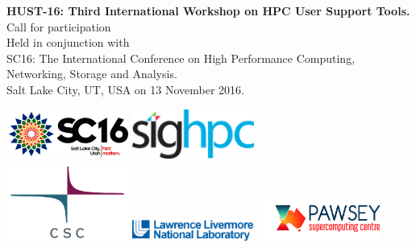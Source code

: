 \documentclass[11pt,a4paper]{article}
\begin{document}
\begin{titlepage}
\begin{center}
\vspace{35mm}
{\bf {\selectfont \fontsize{30}{35}\selectfont HUST-16:  Third International Workshop on HPC User Support Tools.}}\\
\vspace{20mm}
{ {\selectfont \Huge Call for participation}}\\
\vspace{10mm}
{ {\selectfont \Huge Held in conjunction with }}\\
{ {\selectfont \Huge SC16: The International Conference on High
Performance Computing, Networking, Storage and Analysis.}}\\
\vspace{40mm}
{ {\selectfont \Huge Salt Lake City, UT, USA on 13 November 2016. }}\\
\vspace{25mm}

\includegraphics[width=40mm]{../img/SC16-4CNoOutlineRedtxt.png}
\hspace{20mm}
\includegraphics[width=40mm]{../img/sighpc-logo.png}
\\
\includegraphics[width=40mm]{../img/CSC_2012_LOGO_RGB.pdf}
\hspace{10mm}
\includegraphics[width=40mm]{../img/lab_logo_blue.png}
\hspace{10mm}
\includegraphics[width=40mm]{../img/PawseyLogoHorizontal.jpg}

\end{center}
\end{titlepage}
\end{document}
